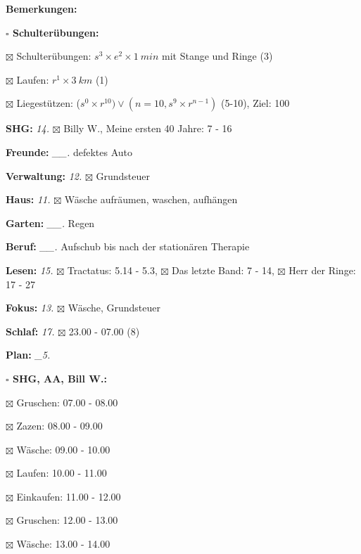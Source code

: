\documentclass[10pt,a4paper]{article}
\newcommand\prop[1] {{\color {alizarin} {\bf #1}}}             %
\newcommand\mand[1] {{\color {burntorange} {\bf #1}}}          %
\newcommand\topspace{\vskip -15pt \hskip 20pt}
\newcommand\bottomspace{\vskip 4pt}
\newcommand\n[1] { {\sl #1.} \hskip 5pt }
\begin{document}
\begin{mdframed}[style=daystyle]
\begin{labeling}{{\mand {Bemerkungen:}}}
\begin{minipage}{0.75\textwidth}
\begin{labeling}{\prop {$\square$ {Schulterübungen:}}}
      \item[$\boxtimes$ Schulterübungen:] $s^3 \times e^2 \times 1\ min$ mit Stange und Ringe (3)
      \item[$\boxtimes$ Laufen:]          $r^1 \times 3\ km$ (1)
      \item[$\boxtimes$ Liegestützen:]    ($s^0 \times r^{10}) \vee (n=10, s^9 \times r^{n-1})$ (5-10), Ziel: 100
      \end{labeling}
    \end{minipage}
    \bottomspace        
  \item[{\mand {SHG:}}]            \n{14} $\boxtimes$ Billy W., Meine ersten 40 Jahre: 7 - 16
  \item[{\mand {Freunde:}}]      \n{\_\_} defektes Auto
  \item[{\mand {Verwaltung:}}]     \n{12} $\boxtimes$ Grundsteuer
  \item[{\mand {Haus:}}]           \n{11} $\boxtimes$ Wäsche aufräumen, waschen, aufhängen
  \item[{\mand {Garten:}}]       \n{\_\_} Regen
  \item[{\mand {Beruf:}}]        \n{\_\_} Aufschub bis nach der stationären Therapie
  \item[{\mand {Lesen:}}]          \n{15} $\boxtimes$ Tractatus: 5.14 - 5.3,
      $\boxtimes$ Das letzte Band: 7 - 14, $\boxtimes$ Herr der Ringe: 17 - 27
  \item[{\mand {Fokus:}}]          \n{13} $\boxtimes$ Wäsche, Grundsteuer
  \item[{\mand {Schlaf:}}]         \n{17} $\boxtimes$ 23.00 - 07.00 (8)
  \item[{\mand {Plan:}}]          \n{\_5}
    \topspace
    \begin{minipage}{0.75\textwidth}  
      \begin{labeling}{\prop {$\square$ {SHG, AA, Bill W.:}}} 
        \setlength\itemsep{-3pt}
      \item[$\boxtimes$ Gruschen:]         07.00 - 08.00
      \item[$\boxtimes$ Zazen:]            08.00 - 09.00
      \item[$\boxtimes$ Wäsche:]           09.00 - 10.00
      \item[$\boxtimes$ Laufen:]           10.00 - 11.00
      \item[$\boxtimes$ Einkaufen:]        11.00 - 12.00
      \item[$\boxtimes$ Gruschen:]         12.00 - 13.00
      \item[$\boxtimes$ Wäsche:]           13.00 - 14.00

\end{labeling}
\end{minipage}
\end{labeling}
\end{mdframed}
\end{document}

